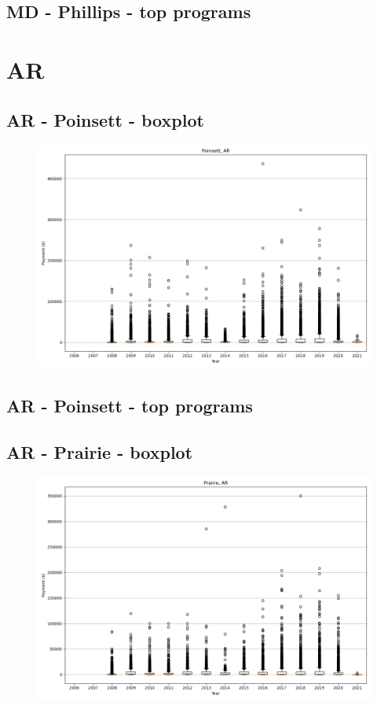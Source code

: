 \subsection*{MD - Phillips - top programs}

\newpage
\section*{AR}
\subsection*{AR - Poinsett - boxplot}
\begin{figure}[h]
\centering
\includegraphics[width=7in]{../output/boxplots/counties/Poinsett-AR_boxplot.png}
\end{figure}


\subsection*{AR - Poinsett - top programs}

\newpage
\subsection*{AR - Prairie - boxplot}
\begin{figure}[h]
\centering
\includegraphics[width=7in]{../output/boxplots/counties/Prairie-AR_boxplot.png}
\end{figure}


